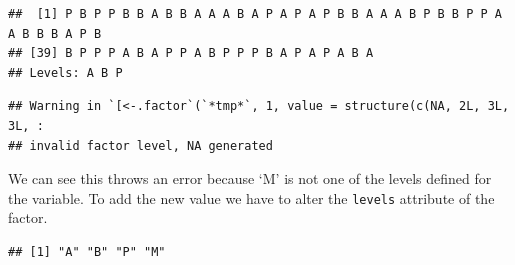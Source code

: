 \documentclass[
]{book}
\newenvironment{Shaded}{\begin{snugshade}}{\end{snugshade}}
\newcommand{\CommentTok}[1]{\textcolor[rgb]{0.56,0.35,0.01}{\textit{#1}}}
\newcommand{\DecValTok}[1]{\textcolor[rgb]{0.00,0.00,0.81}{#1}}
\newcommand{\KeywordTok}[1]{\textcolor[rgb]{0.13,0.29,0.53}{\textbf{#1}}}
\newcommand{\NormalTok}[1]{#1}
\newcommand{\OperatorTok}[1]{\textcolor[rgb]{0.81,0.36,0.00}{\textbf{#1}}}
\newcommand{\StringTok}[1]{\textcolor[rgb]{0.31,0.60,0.02}{#1}}
\theoremstyle{definition}
\theoremstyle{definition}
\theoremstyle{definition}
\theoremstyle{remark}
\begin{document}
\begin{Shaded}
\end{Shaded}

\begin{verbatim}
##  [1] P B P P B B A B B A A A B A P A P A P B B A A A B P B B P P A A B B B A P B
## [39] B P P P A B A P P A B P P P B A P A P A B A
## Levels: A B P
\end{verbatim}

\begin{Shaded}
\end{Shaded}

\begin{verbatim}
## Warning in `[<-.factor`(`*tmp*`, 1, value = structure(c(NA, 2L, 3L, 3L, :
## invalid factor level, NA generated
\end{verbatim}

We can see this throws an error because `M' is not one of the levels defined for the variable. To add the new value we have to alter the \texttt{levels} attribute of the factor.

\begin{Shaded}
\end{Shaded}

\begin{verbatim}
## [1] "A" "B" "P" "M"
\end{verbatim}

\begin{Shaded}
\end{Shaded}
\end{document}
